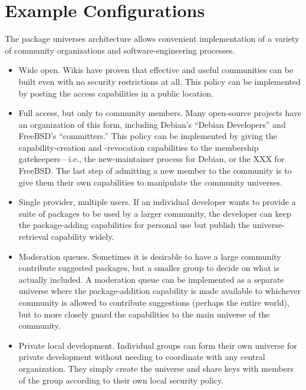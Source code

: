 \documentclass{IEEEtran}
\begin{document}
\section{Example Configurations}
The package universes architecture allows convenient implementation of
a variety of community organizations and software-engineering
processes.
\begin{itemize}
\item Wide open.  Wikis have proven that effective and useful
      communities can be built even with no security restrictions at
      all.  This policy can be implemented by posting the access
      capabilities in a public location.

\item Full access, but only to community members.  Many open-source
      projects have an organization of this form, including Debian's
      ``Debian Developers'' and FreeBSD's ``committers.''  This policy
      can be implemented by giving the capability-creation and
      -revocation capabilities to the membership gatekeepers---i.e.,
      the new-maintainer process for Debian, or the XXX for FreeBSD.
      The last step of admitting a new member to the community is to
      give them their own capabilities to manipulate the community
      universes.

\item Single provider, multiple users.  If an individual developer
      wants to provide a suite of packages to be used by a larger 
      community, the developer can keep the package-adding capabilities
      for personal use but publish the universe-retrieval capability
      widely.

\item Moderation queues.  Sometimes it is desirable to have a large
      community contribute suggested packages, but a smaller group to
      decide on what is actually included.  A moderation queue can be
      implemented as a separate universe where the package-addition
      capability is made available to whichever community is allowed
      to contribute suggestions (perhaps the entire world), but to
      more closely guard the capabilities to the main universe of the
      community.

\item Private local development.  Individual groups can form their own
      universe for private development without needing to coordinate
      with any central organization.  They simply create the universe
      and share keys with members of the group according to their
      own local security policy.


\end{itemize}
\end{document}
